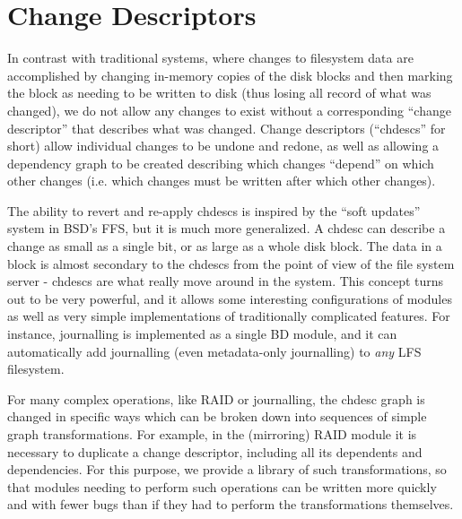 \section{Change Descriptors}
\label{sec:chdescs}

In contrast with traditional systems, where changes to filesystem data are
accomplished by changing in-memory copies of the disk blocks and then marking
the block as needing to be written to disk (thus losing all record of what was
changed), we do not allow any changes to exist without a corresponding ``change
descriptor'' that describes what was changed. Change descriptors (``chdescs''
for short) allow individual changes to be undone and redone, as well as allowing
a dependency graph to be created describing which changes ``depend'' on which
other changes (i.e. which changes must be written after which other changes).

The ability to revert and re-apply chdescs is inspired by the ``soft updates''
system in BSD's FFS, but it is much more generalized. A chdesc can describe a
change as small as a single bit, or as large as a whole disk block. The data in
a block is almost secondary to the chdescs from the point of view of the file
system server - chdescs are what really move around in the system. This concept
turns out to be very powerful, and it allows some interesting configurations of
modules as well as very simple implementations of traditionally complicated
features. For instance, journalling is implemented as a single BD module, and it
can automatically add journalling (even metadata-only journalling) to {\it any}
LFS filesystem.

For many complex operations, like RAID or journalling, the chdesc graph is
changed in specific ways which can be broken down into sequences of simple graph
transformations. For example, in the (mirroring) RAID module it is necessary to
duplicate a change descriptor, including all its dependents and dependencies.
For this purpose, we provide a library of such transformations, so that modules
needing to perform such operations can be written more quickly and with fewer
bugs than if they had to perform the transformations themselves.
